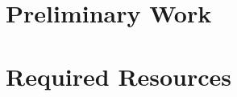 \documentclass[letterpaper]{tandon_thesis}
\begin{document}
\section{Preliminary Work}\label{sec:ChapThreeResults}


\section{Required Resources}\label{sec:ChapThreeDiscussion} 






{\singlespace
\printbibliography}


\end{document}
